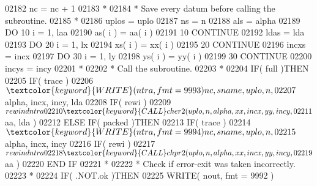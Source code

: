 \begin{DoxyCode}
02182                      nc = nc + 1
02183 \textcolor{comment}{*}
02184 \textcolor{comment}{*                    Save every datum before calling the subroutine.}
02185 \textcolor{comment}{*}
02186                      uplos = uplo
02187                      ns = n
02188                      als = alpha
02189                      \textcolor{keywordflow}{DO} 10 i = 1, laa
02190                         as( i ) = aa( i )
02191    10                \textcolor{keywordflow}{CONTINUE}
02192                      ldas = lda
02193                      \textcolor{keywordflow}{DO} 20 i = 1, lx
02194                         xs( i ) = xx( i )
02195    20                \textcolor{keywordflow}{CONTINUE}
02196                      incxs = incx
02197                      \textcolor{keywordflow}{DO} 30 i = 1, ly
02198                         ys( i ) = yy( i )
02199    30                \textcolor{keywordflow}{CONTINUE}
02200                      incys = incy
02201 \textcolor{comment}{*}
02202 \textcolor{comment}{*                    Call the subroutine.}
02203 \textcolor{comment}{*}
02204                      \textcolor{keywordflow}{IF}( full )\textcolor{keywordflow}{THEN}
02205                         \textcolor{keywordflow}{IF}( trace )
02206      $                     \textcolor{keyword}{WRITE}( ntra, fmt = 9993 )nc, sname, uplo, n,
02207      $                     alpha, incx, incy, lda
02208                         \textcolor{keywordflow}{IF}( rewi )
02209      $                     rewind ntra
02210                         \textcolor{keyword}{CALL }cher2( uplo, n, alpha, xx, incx, yy, incy,
02211      $                              aa, lda )
02212                      \textcolor{keywordflow}{ELSE} \textcolor{keywordflow}{IF}( packed )\textcolor{keywordflow}{THEN}
02213                         \textcolor{keywordflow}{IF}( trace )
02214      $                     \textcolor{keyword}{WRITE}( ntra, fmt = 9994 )nc, sname, uplo, n,
02215      $                     alpha, incx, incy
02216                         \textcolor{keywordflow}{IF}( rewi )
02217      $                     rewind ntra
02218                         \textcolor{keyword}{CALL }chpr2( uplo, n, alpha, xx, incx, yy, incy,
02219      $                              aa )
02220 \textcolor{keywordflow}{                     END IF}
02221 \textcolor{comment}{*}
02222 \textcolor{comment}{*                    Check if error-exit was taken incorrectly.}
02223 \textcolor{comment}{*}
02224                      \textcolor{keywordflow}{IF}( .NOT.ok )\textcolor{keywordflow}{THEN}
02225                         \textcolor{keyword}{WRITE}( nout, fmt = 9992 )

\end{DoxyCode}

